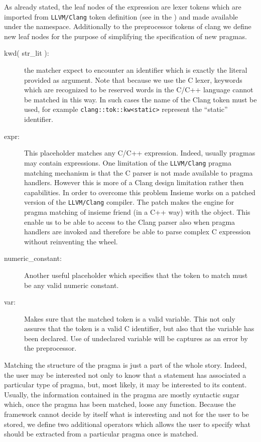As already stated, the leaf nodes of the expression are lexer tokens which are
imported from {\tt LLVM/Clang} token definition (see in the
) and made available under the
 namespace. Additionally to the preprocessor tokens
of clang we define new leaf nodes for the purpose of simplifying the
specification of new pragmas. 

\begin{description}
\item [kwd( str\_lit ):] the matcher expect to encounter an identifier which is
exactly the literal provided as argument. Note that because we use the C lexer,
keywords which are recognized to be reserved words in the C/C++ language cannot
be matched in this way. In such cases the name of the Clang token must be used,
for example {\tt clang::tok::kw<static>} represent the ``static'' identifier. 

\item [expr:] This placeholder matches any C/C++ expression. Indeed, usually
pragmas may contain expressions. One limitation of the {\tt LLVM/Clang} pragma
matching mechanism is that the C parser is not made available to pragma
handlers. However this is more of a Clang design limitation rather then
capabilities. In order to overcome this problem Insieme works on a patched
version of the {\tt LLVM/Clang} compiler.  The patch makes the engine for pragma
matching of insieme friend (in a C++ way) with the  object.
This enable us to be able to access to the Clang parser also when pragma
handlers are invoked and therefore be able to parse complex C expression without
reinventing the wheel. 

\item [numeric\_constant:] Another useful placeholder which specifies that the
token to match must be any valid numeric constant. 

\item [var:] Makes sure that the matched token is a valid variable. This not
only assures that the token is a valid C identifier, but also that the variable
has been declared. Use of undeclared variable will be captures as an error by
the preprocessor. 
\end{description}

Matching the structure of the pragma is just a part of the whole story. Indeed,
the user may be interested not only to know that a statement has associated a
particular type of pragma, but, most likely, it may be interested to its content. 
Usually, the information contained in the pragma
are mostly syntactic sugar which, once the pragma has been matched, loose any
function. Because the framework cannot decide by itself what is
interesting and not for the user to be stored, we define two additional
operators which allows the user to specify what should be extracted from a
particular pragma once is matched. 


